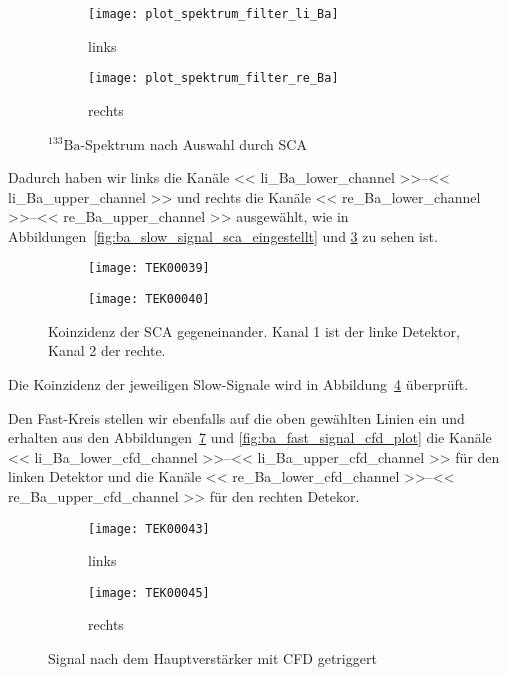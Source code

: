 \documentclass[11pt, ngerman, fleqn, DIV=15, headinclude, BCOR=2cm]{scrreprt}
\begin{document}
\begin{figure}
	\centering
	\begin{subfigure}{0.49 \textwidth}
		\texttt{[image: plot\_spektrum\_filter\_li\_Ba]}
		\caption{%
			links
		}
		\label{fig:ba_slow_sca_eingestellt-li_plot}
	\end{subfigure}
	\begin{subfigure}{0.49 \textwidth}
		\texttt{[image: plot\_spektrum\_filter\_re\_Ba]}
		\caption{%
			rechts
		}
		\label{fig:ba_slow_sca_eingestellt-re_plot}
	\end{subfigure}
	\caption{%
		$^{133}\text{Ba}$-Spektrum nach Auswahl durch SCA
	}
	\label{fig:ba_slow_signal_sca_eingestellt_plot}
\end{figure}

Dadurch haben wir links die Kanäle
\numrange{<< li_Ba_lower_channel >>}{<< li_Ba_upper_channel >>} und rechts
die Kanäle
\numrange{<< re_Ba_lower_channel >>}{<< re_Ba_upper_channel >>} ausgewählt, wie
in Abbildungen~\ref{fig:ba_slow_signal_sca_eingestellt} und
\ref{fig:ba_slow_signal_sca_eingestellt_plot} zu sehen ist.


\begin{figure}
	\centering
	\begin{subfigure}{0.49 \textwidth}
		\texttt{[image: TEK00039]}
	\end{subfigure}
	\begin{subfigure}{0.49 \textwidth}
		\texttt{[image: TEK00040]}
	\end{subfigure}
	\caption{%
		Koinzidenz der SCA gegeneinander. Kanal 1 ist der linke
		Detektor, Kanal 2 der rechte.
	}
	\label{fig:ba_slow_signal_sca_koinzidenz}
\end{figure}

Die Koinzidenz der jeweiligen Slow-Signale wird in
Abbildung~\ref{fig:ba_slow_signal_sca_koinzidenz} überprüft.

Den Fast-Kreis stellen wir ebenfalls auf die oben gewählten Linien ein und
erhalten aus den Abbildungen~\ref{fig:ba_fast_signal_cfd_trig} und
\ref{fig:ba_fast_signal_cfd_plot} die Kanäle
\numrange{<< li_Ba_lower_cfd_channel >>}{<< li_Ba_upper_cfd_channel >>} für den
linken Detektor und
die Kanäle
\numrange{<< re_Ba_lower_cfd_channel >>}{<< re_Ba_upper_cfd_channel >>} für den
rechten Detekor.


\begin{figure}
	\centering
	\begin{subfigure}{0.49 \textwidth}
		\texttt{[image: TEK00043]}
		\caption{%
			links
		}
		\label{fig:ba_fast_signal_cfd_trig-li}
	\end{subfigure}
	\begin{subfigure}{0.49 \textwidth}
		\texttt{[image: TEK00045]}
		\caption{%
			rechts
		}
		\label{fig:ba_fast_signal_cfd_trig-re}
	\end{subfigure}
	\caption{%
		Signal nach dem Hauptverstärker mit CFD getriggert
	}
	\label{fig:ba_fast_signal_cfd_trig}
\end{figure}
\end{document}
